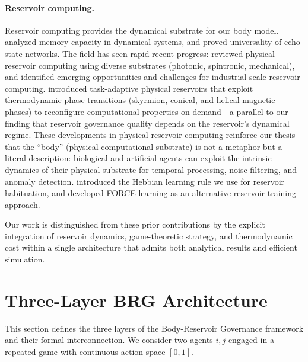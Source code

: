 \documentclass[11pt,a4paper]{article}
\theoremstyle{definition}
\begin{document}
\paragraph{Reservoir computing.}
Reservoir computing \citep{jaeger2001, lukovsevivcius2009} provides the
dynamical substrate for our body model.  \citet{ganguli2008} analyzed
memory capacity in dynamical systems, and \citet{grigoryeva2018} proved
universality of echo state networks.
The field has seen rapid recent progress: \citet{tanaka2019} reviewed
physical reservoir computing using diverse substrates (photonic, spintronic,
mechanical), and \citet{yan2024rc} identified emerging opportunities
and challenges for industrial-scale reservoir computing.
\citet{lee2024rc} introduced task-adaptive physical reservoirs that
exploit thermodynamic phase transitions (skyrmion, conical, and helical
magnetic phases) to reconfigure computational properties on demand---a
parallel to our finding that reservoir governance quality depends
on the reservoir's dynamical regime.
These developments in physical reservoir computing reinforce our thesis that
the ``body'' (physical computational substrate) is not a metaphor but a
literal description: biological and artificial agents can exploit the
intrinsic dynamics of their physical substrate for temporal processing,
noise filtering, and anomaly detection.
\citet{oja1982} introduced the Hebbian learning rule we use for reservoir
habituation, and \citet{sussillo2009} developed FORCE learning as an
alternative reservoir training approach.

Our work is distinguished from these prior contributions by the explicit
integration of reservoir dynamics, game-theoretic strategy, and
thermodynamic cost within a single architecture that admits both analytical
results and efficient simulation.


\section{Three-Layer BRG Architecture}
\label{sec:architecture}

This section defines the three layers of the Body-Reservoir Governance framework
and their formal interconnection.  We consider two agents $i, j$ engaged in a
repeated game with continuous action space $[0,1]$.
\end{document}
